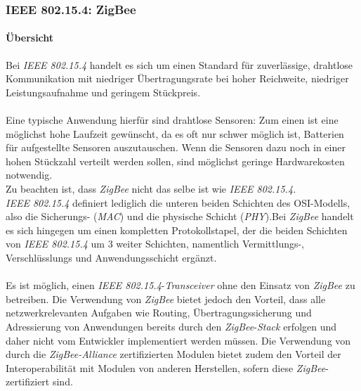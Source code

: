         \subsubsection{IEEE 802.15.4: ZigBee}

            \paragraph{Übersicht}
                Bei \emph{IEEE 802.15.4} handelt es sich um einen Standard für 
                zuverlässige, drahtlose Kommunikation mit niedriger Übertragungsrate
                bei hoher Reichweite, niedriger Leistungsaufnahme und geringem Stückpreis.\\
                \\
                Eine typische Anwendung hierfür sind drahtlose Sensoren: Zum einen
                ist eine möglichst hohe Laufzeit gewünscht, da es oft nur schwer
                möglich ist, Batterien für aufgestellte Sensoren auszutauschen.
                Wenn die Sensoren dazu noch in einer hohen Stückzahl verteilt werden
                sollen, sind möglichst geringe Hardwarekosten notwendig.
                \\
                Zu beachten ist, dass \emph{ZigBee} nicht das selbe ist wie \emph{IEEE 802.15.4.}\\
                \emph{IEEE 802.15.4} definiert lediglich die unteren beiden Schichten des
                OSI-Modells, also die Sicherungs- (\emph{MAC}) und die physische Schicht 
                (\emph{PHY}).Bei \emph{ZigBee} handelt es sich hingegen um einen kompletten Protokollstapel,
                der die beiden Schichten von \emph{IEEE 802.15.4} um 3 weiter Schichten,
                namentlich Vermittlungs-, Verschlüsslungs und Anwendungsschicht 
                ergänzt. \cite{zigbee_specification}   \\
                \\
                Es ist möglich, einen \emph{IEEE 802.15.4}-\emph{Transceiver} ohne den Einsatz
                von \emph{ZigBee} zu betreiben. Die Verwendung von \emph{ZigBee} bietet jedoch
                den Vorteil, dass alle netzwerkrelevanten Aufgaben wie Routing,
                Übertragungssicherung und Adressierung von Anwendungen bereits
                durch den \emph{ZigBee}-\emph{Stack} erfolgen und daher nicht vom Entwickler
                implementiert werden müssen. Die Verwendung von durch die
                \emph{ZigBee-Alliance} zertifizierten Modulen bietet zudem den
                Vorteil der Interoperabilität mit Modulen von anderen Herstellen,
                sofern diese \emph{ZigBee}-zertifiziert sind.

